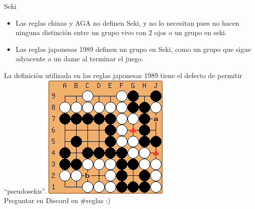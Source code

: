 \documentclass{beamer}
\begin{document}
\begin{frame}{Seki}
    \begin{itemize}
        \item Las reglas chinas y AGA no definen Seki, y no lo necesitan pues no hacen ninguna distinción entre un grupo vivo con 2 ojos o un grupo en seki.
        \item Las reglas japonesas 1989 definen un grupo en Seki, como un grupo que sigue adyacente a un dame al terminar el juego.
    \end{itemize}
    La definición utilizada en las reglas japonesas 1989 tiene el defecto de permitir ``pseudosekis''.
    \includegraphics[scale=0.4]{pseudoseki.png}
    \\
    Preguntar en Discord en \#reglas :)
\end{frame}

%    
%
\end{document}
